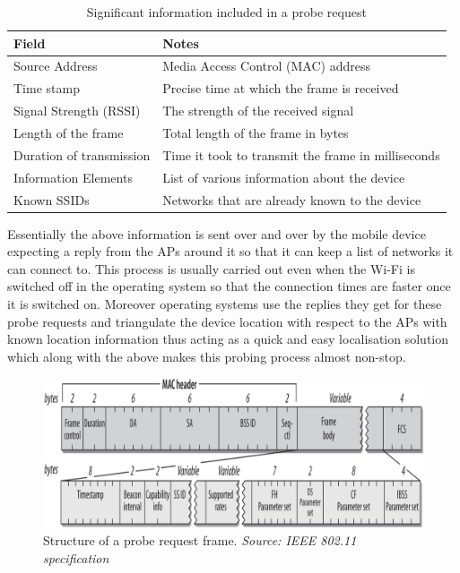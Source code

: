 \begin{table}
  \footnotesize
  \begin{center}
    \begin{tabular}{lp{7.5cm}}
      \toprule
        Field & Notes\\
      \midrule
        Source Address & Media Access Control (MAC) address\\
        Time stamp & Precise time at which the frame is received\\
        Signal Strength (RSSI) & The strength of the received signal\\
        Length of the frame & Total length of the frame in bytes\\
        Duration of transmission & Time it took to transmit the frame in milliseconds\\
        Information Elements & List of various information about the device\\
        Known SSIDs & Networks that are already known to the device\\
      \bottomrule
    \end{tabular}
  \end{center}
  \caption{Significant information included in a probe request}
  \label{table:collection:proberequest}
\end{table}

Essentially the above information is sent over and over by the mobile device expecting a reply from the APs around it so that it can keep a list of networks it can connect to.
This process is usually carried out even when the Wi-Fi is switched off in the operating system so that the connection times are faster once it is switched on.
Moreover operating systems use the replies they get for these probe requests and triangulate the device location with respect to the APs with known location information thus acting as a quick and easy localisation solution which along with the above makes this probing process almost non-stop. 

\begin{figure}
  \includegraphics{images/probe-request-structure.png}
  \caption{Structure of a probe request frame. \textit{Source: IEEE 802.11 specification}}
  \label{figure:collection:proberequest}
\end{figure}


